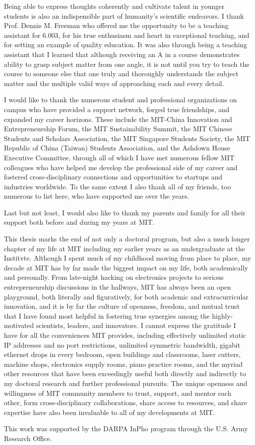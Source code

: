 Being able to express thoughts coherently and cultivate talent in younger students is also an indispensible part of humanity's scientific endeavors. I thank Prof. Dennis M. Freeman who offered me the opportunity to be a teaching assistant for 6.003, for his true enthusiasm and heart in exceptional teaching, and for setting an example of quality education. It was also through being a teaching assistant that I learned that although receiving an A in a course demonstrates ability to grasp subject matter from one angle, it is not until you try to teach the course to someone else that one truly and thoroughly understands the subject matter and the multiple valid ways of approaching each and every detail.

I would like to thank the numerous student and professional organizations on campus who have provided a support network, forged true friendships, and expanded my career horizons. These include the MIT-China Innovation and Entrepreneurship Forum, the MIT Sustainability Summit, the MIT Chinese Students and Scholars Association, the MIT Singapore Students Society, the MIT Republic of China (Taiwan) Students Association, and the Ashdown House Executive Committee, through all of which I have met numerous fellow MIT colleagues who have helped me develop the professional side of my career and fostered cross-disciplinary connections and opportunities to startups and industries worldwide. To the same extent I also thank all of my friends, too numerous to list here, who have supported me over the years.

Last but not least, I would also like to thank my parents and family for all their support both before and during my years at MIT.

This thesis marks the end of not only a doctoral program, but also a much longer chapter of my life at MIT including my earlier years as an undergraduate at the Institvte. Although I spent much of my childhood moving from place to place, my decade at MIT has by far made the biggest impact on my life, both academically and personally. From late-night hacking on electronics projects to serious entrepreneurship discussions in the hallways, MIT has always been an open playground, both literally and figuratively, for both academic and extracurricular innovation, and it is by far the culture of openness, freedom, and mutual trust that I have found most helpful in fostering true synergies among the highly-motivated scientists, leaders, and innovators. I cannot express the gratitude I have for all the conveniences MIT provides, including effectively unlimited static IP addresses and no port restrictions, unlimited symmetric bandwidth, gigabit ethernet drops in every bedroom, open buildings and classrooms, laser cutters, machine shops, electronics supply rooms, piano practice rooms, and the myriad other resources that have been exceedingly useful both directly and indirectly to my doctoral research and further professional pursuits. The unique openness and willingness of MIT community members to trust, support, and mentor each other, form cross-disciplinary collaborations, share access to resources, and share expertise have also been invaluable to all of my developments at MIT.

This work was supported by the DARPA InPho program through the U.S. Army Research Office.
